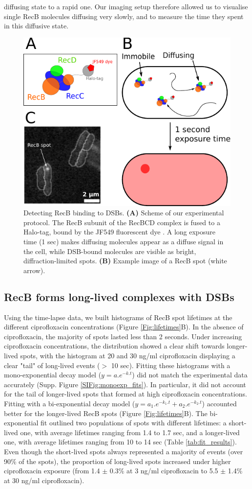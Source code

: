 diffusing state to a rapid one. Our imaging setup therefore allowed us to visualise single RecB molecules diffusing very slowly, and to measure the time they spent in this diffusive state.

\begin{figure}[htbp]
    \centering
    \includegraphics[width=.45\textwidth]{Figures/Fig1_Exp_principle.pdf}
    \caption{Detecting RecB binding to DSBs. \textbf{(A)} Scheme of our experimental protocol. The RecB subunit of the RecBCD complex is fused to a Halo-tag, bound by the JF549 fluorescent dye \cite{Lepore2019a, Lepore2023}. A long exposure time (1 sec) makes diffusing molecules appear as a diffuse signal in the cell, while DSB-bound molecules are visible as bright, diffraction-limited spots. \textbf{(B)} Example image of a RecB spot (white arrow).}
    \label{Fig:exp_principle}
\end{figure}

\subsection*{RecB forms long-lived complexes with DSBs}
Using the time-lapse data, we built histograms of RecB spot lifetimes at the different ciprofloxacin concentrations (Figure \ref{Fig:lifetimes}B). In the absence of ciprofloxacin, the majority of spots lasted less than 2 seconds. Under increasing ciprofloxacin concentrations, the distribution showed a clear shift towards longer-lived spots, with the histogram at 20 and 30 ng/ml ciprofloxacin displaying a clear "tail" of long-lived events ($>$ 10 sec). Fitting these histograms with a mono-exponential decay model ($y = a.e^{-k.t}$) did not match the experimental data accurately (Supp. Figure \ref{SIFig:monoexp_fits}). In particular, it did not account for the tail of longer-lived spots that formed at high ciprofloxacin concentrations. Fitting with a bi-exponential decay model ($y = a_1.e^{-k_1.t} + a_2.e^{-k_2.t}$) accounted better for the longer-lived RecB spots (Figure \ref{Fig:lifetimes}B). The bi-exponential fit outlined two populations of spots with different lifetimes: a short-lived one, with average lifetimes ranging from 1.4 to 1.7 sec, and a longer-lived one, with average lifetimes ranging from 10 to 14 sec (Table \ref{tab:fit_results}). Even though the short-lived spots always represented a majority of events (over 90\% of the spots), the proportion of long-lived spots increased under higher ciprofloxacin exposure (from 1.4 $\pm$ 0.3\% at 3 ng/ml ciprofloxacin to 5.5 $\pm$ 1.4\% at 30 ng/ml ciprofloxacin).

